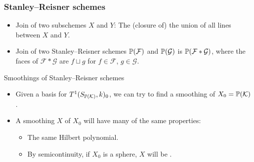 \begin{frame}
\frametitle{Stanley--Reisner schemes}

\begin{itemize}
	\item
	\alert{Join} of two subschemes $X$ and $Y$: The (closure of) the union of all lines between $X$ and $Y$.

	\item
	\alert{Join} of two Stanley--Reisner schemes $\P(\mathcal F)$ and $\P(\mathcal G)$ is $\P(\mathcal F \ast \mathcal G)$, where the faces of $\mathcal F  \ast \mathcal G$ are $f \sqcup g$ for $f \in \mathcal F$, $g \in \mathcal G$.
\end{itemize}

\pause

Smoothings of Stanley--Reisner schemes

\begin{itemize}
	\item Given a basis for $T^1(S_{\P(\mathcal K)},k)_0$, we can try to find a smoothing of $X_0 = \P(\mathcal K)$.
	\item A smoothing $X$ of $X_0$ will have many of the same properties:
		\begin{itemize}
			\item The same Hilbert polynomial.
			\item By semicontinuity, if $X_0$ is a sphere, $X$ will be \CY. %
		\end{itemize}
\end{itemize}


\end{frame}